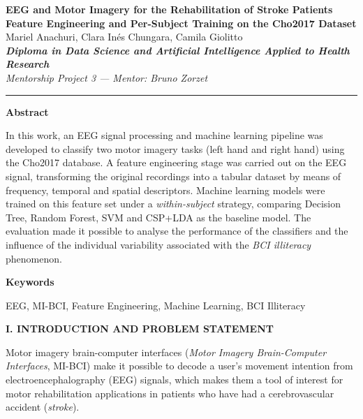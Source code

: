 \documentclass[12pt,a4paper]{article}
\newcommand{\mainsection}[1]{%
  \par\bigskip\noindent\textbf{#1}\par\nopagebreak}
\begin{document}
\begin{center}
  {\textbf{EEG and Motor Imagery for the Rehabilitation of Stroke Patients}}\\[2pt]
  {\textbf{Feature Engineering and Per-Subject Training on the Cho2017 Dataset}}\\[2pt]
  Mariel Anachuri, Clara Inés Chungara, Camila Giolitto\\[10pt]
  {\small\textbf{\textit{Diploma in Data Science and Artificial Intelligence Applied to Health Research}}}\\[2pt]
  \textit{Mentorship Project 3 --- Mentor: Bruno Zorzet}
\end{center}
\vspace{-4pt}
\noindent\rule{\textwidth}{0.4pt}

\noindent\textbf{Abstract}\par
In this work, an EEG signal processing and machine learning pipeline was developed to classify
two motor imagery tasks (left hand and right hand) using the Cho2017 database. A feature
engineering stage was carried out on the EEG signal, transforming the original recordings into
a tabular dataset by means of frequency, temporal and spatial descriptors. Machine learning
models were trained on this feature set under a \textit{within-subject} strategy, comparing
Decision Tree, Random Forest, SVM and CSP+LDA as the baseline model. The evaluation made it
possible to analyse the performance of the classifiers and the influence of the individual
variability associated with the \textit{BCI illiteracy} phenomenon.

\noindent\textbf{Keywords}\par
EEG, MI-BCI, Feature Engineering, Machine Learning, BCI Illiteracy

\mainsection{I. INTRODUCTION AND PROBLEM STATEMENT}
Motor imagery brain-computer interfaces (\textit{Motor Imagery Brain-Computer Interfaces},
MI-BCI) make it possible to decode a user's movement intention from electroencephalography
(EEG) signals, which makes them a tool of interest for motor rehabilitation applications in
patients who have had a cerebrovascular accident (\textit{stroke}).
\end{document}

